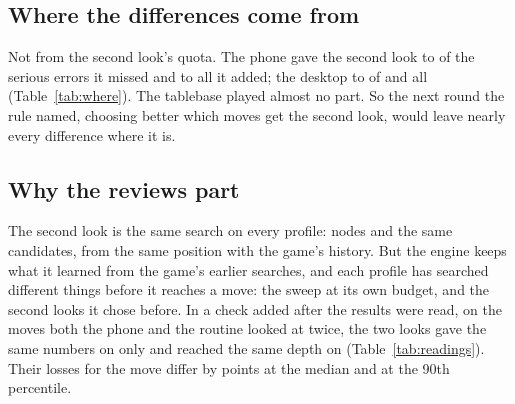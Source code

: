 \documentclass[11pt]{article}
\begin{document}
\begin{table}[h]
\centering
\scriptsize\VerdictTable
\caption{The rule: serious errors (mistakes, blunders and misses) named by the routine and by each
device over the \Cases{} games, the routine's that the device missed, the device's that the routine
does not name, the two shares with their 95\% intervals, and the verdict against the \Line\% line.}
\label{tab:verdict}
\end{table}

\begin{table}[h]
\centering
\scriptsize\OtherTable
\caption{Beside the rule: the same shares for blunders alone and for inaccuracies, and the share of
all moves whose class differs in any way, with 95\% intervals.}
\label{tab:other}
\end{table}

\subsection{Where the differences come from}

Not from the second look's quota. The phone gave the second look to \PhoneMissedVerified{} of the
\PhoneMissed{} serious errors it missed and to all \PhoneExtra{} it added; the desktop to
\DesktopMissedVerified{} of \DesktopMissed{} and all \DesktopExtra{} (Table~\ref{tab:where}). The
tablebase played almost no part. So the next round the rule named, choosing better which moves get
the second look, would leave nearly every difference where it is.

\begin{table}[h]
\centering
\scriptsize\WhereTable
\caption{Where each missed or extra serious error comes from: whether the device gave the move the
second look or left it at the sweep's reading, and whether the routine's reading came from the
tablebase.}
\label{tab:where}
\end{table}

\subsection{Why the reviews part}

The second look is the same search on every profile: \VerifyNodes{} nodes and the same candidates,
from the same position with the game's history. But the engine keeps what it learned from the game's
earlier searches, and each profile has searched different things before it reaches a move: the
sweep at its own budget, and the second looks it chose before. In a check added after the results
were read, on the \PhoneBothLooked{} moves both the phone and the routine looked at twice, the two
looks gave the same numbers on only \PhoneIdentical{} and reached the same depth on
\PhoneSameDepth{} (Table~\ref{tab:readings}). Their losses for the move differ by \PhoneGapMedian{}
points at the median and \PhoneGapNinety{} at the 90th percentile.
\end{document}
